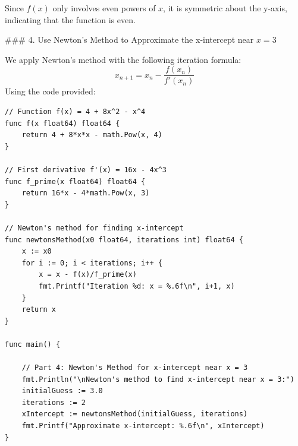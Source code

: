 \documentclass[11pt]{article}
\begin{document}
\begin{center}
    \end{center}

Since \( f(x) \) only involves even powers of \( x \), it is symmetric about the y-axis, indicating that the function is even.

### 4. Use Newton's Method to Approximate the x-intercept near \( x = 3 \)

We apply Newton's method with the following iteration formula:
\[
x_{n+1} = x_n - \frac{f(x_n)}{f'(x_n)}
\]
Using the code provided:

\begin{verbatim}
// Function f(x) = 4 + 8x^2 - x^4
func f(x float64) float64 {
    return 4 + 8*x*x - math.Pow(x, 4)
}

// First derivative f'(x) = 16x - 4x^3
func f_prime(x float64) float64 {
    return 16*x - 4*math.Pow(x, 3)
}

// Newton's method for finding x-intercept
func newtonsMethod(x0 float64, iterations int) float64 {
    x := x0
    for i := 0; i < iterations; i++ {
        x = x - f(x)/f_prime(x)
        fmt.Printf("Iteration %d: x = %.6f\n", i+1, x)
    }
    return x
}

func main() {

    // Part 4: Newton's Method for x-intercept near x = 3
    fmt.Println("\nNewton's method to find x-intercept near x = 3:")
    initialGuess := 3.0
    iterations := 2
    xIntercept := newtonsMethod(initialGuess, iterations)
    fmt.Printf("Approximate x-intercept: %.6f\n", xIntercept)
}
\end{verbatim}
\end{document}
